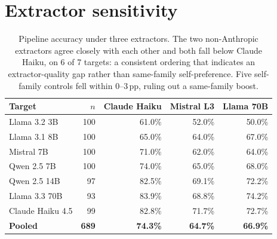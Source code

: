 \section{Extractor sensitivity}
\label{app:crossfam}

\begin{table}[h]
\centering
\small
\caption{Pipeline accuracy under three extractors. The two non-Anthropic extractors agree closely with each other and both fall below Claude Haiku, on 6 of 7 targets: a consistent ordering that indicates an extractor-quality gap rather than same-family self-preference. Five self-family controls fell within 0--3\,pp, ruling out a same-family boost.}
\label{tab:crossfam}
\begin{tabular}{lrrrr}
\toprule
\textbf{Target} & $n$ & \textbf{Claude Haiku} & \textbf{Mistral L3} & \textbf{Llama 70B} \\
\midrule
Llama 3.2 3B     & 100 & 61.0\% & 52.0\% & 50.0\% \\
Llama 3.1 8B     & 100 & 65.0\% & 64.0\% & 67.0\% \\
Mistral 7B       & 100 & 71.0\% & 62.0\% & 64.0\% \\
Qwen 2.5 7B      & 100 & 74.0\% & 65.0\% & 68.0\% \\
Qwen 2.5 14B     & \phantom{0}97 & 82.5\% & 69.1\% & 72.2\% \\
Llama 3.3 70B    & \phantom{0}93 & 83.9\% & 68.8\% & 74.2\% \\
Claude Haiku 4.5 & \phantom{0}99 & 82.8\% & 71.7\% & 72.7\% \\
\midrule
\textbf{Pooled}  & \textbf{689} & \textbf{74.3\%} & \textbf{64.7\%} & \textbf{66.9\%} \\
\bottomrule
\end{tabular}
\end{table}

